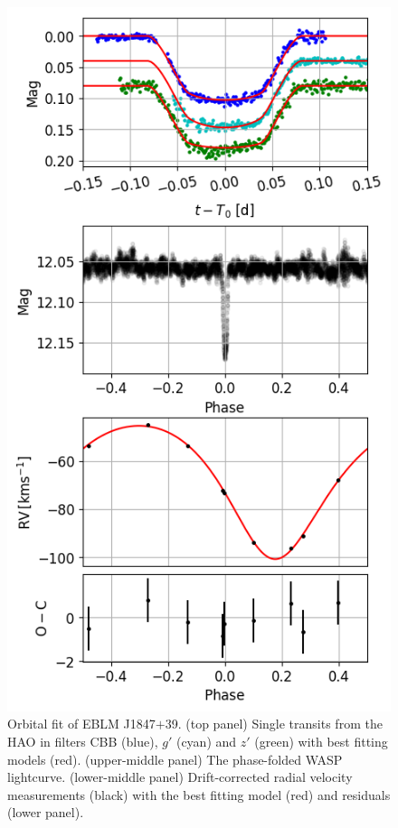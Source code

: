 \begin{figure}[htb]
  \centering
  \includegraphics[scale=0.8]{8-Results/J1847+39/orbital.png}
  \caption{Orbital fit of EBLM J1847$+$39. (top panel) Single transits from the HAO in filters CBB (blue), $g'$ (cyan) and $z'$ (green) with best fitting models (red). (upper-middle panel) The phase-folded WASP lightcurve. (lower-middle panel) Drift-corrected radial velocity measurements (black) with the best fitting model (red) and residuals (lower panel).}
  \label{fig:J1847+39:orbit}
\end{figure}


